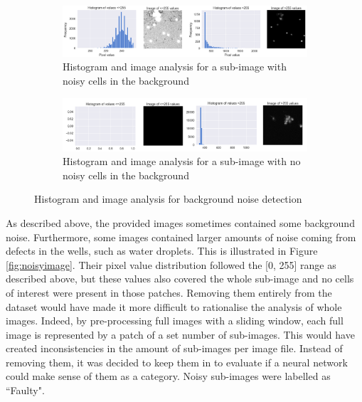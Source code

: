 \begin{figure}[h!]
    \centering
    \begin{subfigure}[h!]{0.99\textwidth}
        \includegraphics[width=\textwidth]{dissertation/figures/background_noise_true.png}
        \caption{Histogram and image analysis for a sub-image with noisy cells in the background}
        \label{fig:bgnoisetrue}
    \end{subfigure}
    
    \begin{subfigure}[h!]{0.99\textwidth}
        \includegraphics[width=\textwidth]{dissertation/figures/background_noise_false.png}
        \caption{Histogram and image analysis for a sub-image with no noisy cells in the background}
        \label{fig:bgnoisefalse}
    \end{subfigure}
    
    \caption{Histogram and image analysis for background noise detection}
    \label{fig:bgnoise}
    
\end{figure}

As described above, the provided images sometimes contained some background noise. Furthermore, some images contained larger amounts of noise coming from defects in the wells, such as water droplets. This is illustrated in Figure \ref{fig:noisyimage}. Their pixel value distribution followed the [0, 255] range as described above, but these values also covered the whole sub-image and no cells of interest were present in those patches. Removing them entirely from the dataset would have made it more difficult to rationalise the analysis of whole images. Indeed, by pre-processing full images with a sliding window, each full image is represented by a patch of a set number of sub-images. This would have created inconsistencies in the amount of sub-images per image file. Instead of removing them, it was decided to keep them in to evaluate if a neural network could make sense of them as a category. Noisy sub-images were labelled as ``Faulty". 

